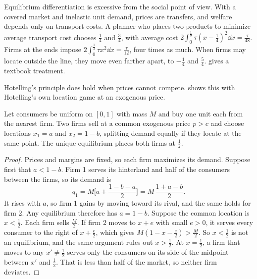 Equilibrium differentiation is excessive from the social point of view. With a covered market and inelastic unit
demand, prices are transfers, and welfare depends only on transport costs. A planner who places two products to
minimize average transport cost chooses $\frac{1}{4}$ and $\frac{3}{4}$, with average cost
$2\int_0^{\frac{1}{2}}\tau(x - \frac{1}{4})^2\dd x = \frac{\tau}{48}$. Firms at the ends impose
$2\int_0^{\frac{1}{2}}\tau x^2\dd x = \frac{\tau}{12}$, four times as much. When firms may locate outside the line, they move
even farther apart, to $-\frac{1}{4}$ and $\frac{5}{4}$.  gives a textbook treatment.

 Hotelling's principle does hold when prices cannot compete.
 shows this with Hotelling's own location game at an exogenous price.

\begin{proposition}\label{prop:04-hotelling-fixed}
Let consumers be uniform on $[0,1]$ with mass $M$ and buy one unit each from the nearest firm. Two firms sell at a
common exogenous price $p > c$ and choose locations $x_1 = a$ and $x_2 = 1 - b$, splitting demand equally if they
locate at the same point. The unique equilibrium places both firms at $\frac{1}{2}$.
\end{proposition}

\begin{proof}
Prices and margins are fixed, so each firm maximizes its demand. Suppose first that $a < 1 - b$. Firm 1 serves its
hinterland and half of the consumers between the firms, so its demand is
\begin{equation*}
q_1 = M\Big[a + \frac{1 - b - a}{2}\Big] = M\,\frac{1 + a - b}{2} .
\end{equation*}
It rises with $a$, so firm 1 gains by moving toward its rival, and the same holds for firm 2. Any equilibrium therefore
has $a = 1 - b$. Suppose the common location is $x < \frac{1}{2}$. Each firm sells $\frac{M}{2}$. If firm 2 moves to
$x + e$ with small $e > 0$, it serves every consumer to the right of $x + \frac{e}{2}$, which gives
$M(1 - x - \frac{e}{2}) > \frac{M}{2}$. So $x < \frac{1}{2}$ is not an equilibrium, and the same argument rules out
$x > \frac{1}{2}$. At $x = \frac{1}{2}$, a firm that moves to any $x' \neq \frac{1}{2}$ serves only the consumers on
its side of the midpoint between $x'$ and $\frac{1}{2}$. That is less than half of the market, so neither firm
deviates.
\end{proof}

